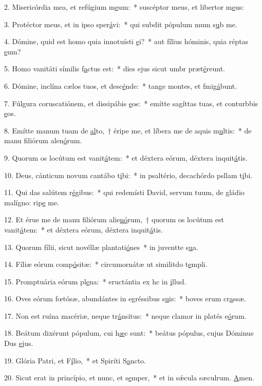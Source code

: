 2. Misericórdia mea, et refúgium m\uline{e}um:~* suscéptor meus, et libertor m\uline{e}us:\par 
3. Protéctor meus, et in ipso sper\uline{á}vi:~* qui subdit pópulum mum s\uline{u}b me.\par 
4. Dómine, quid est homo quia innotuísti \uline{e}i?~* aut fílius hóminis, quia réptas \uline{e}um?\par 
5. Homo vanitáti símilis f\uline{a}ctus est:~* dies ejus sicut umbr præt\uline{é}reunt.\par 
6. Dómine, inclína cælos tuos, et desc\uline{é}nde:~* tange montes, et fmig\uline{á}bunt.\par 
7. Fúlgura coruscatiónem, et dissipábis \uline{e}os:~* emítte sagíttas tuas, et conturbbis \uline{e}os.\par 
8. Emítte manum tuam de \uline{al}to,~† éripe me, et líbera me de aquis m\uline{u}ltis:~* de manu filiórum alen\uline{ó}rum.\par 
9. Quorum os locútum est vanit\uline{á}tem:~* et déxtera eórum, déxtera inquit\uline{á}tis.\par 
10. Deus, cánticum novum cantábo t\uline{i}bi:~* in psaltério, decachórdo psllam t\uline{i}bi.\par 
11. Qui das salútem r\uline{é}gibus:~* qui redemísti David, servum tuum, de gládio malígno: rip\uline{e} me.\par 
12. Et érue me de manu filiórum alie\uline{nó}rum,~† quorum os locútum est vanit\uline{á}tem:~* et déxtera eórum, déxtera inquit\uline{á}tis.\par 
13. Quorum fílii, sicut novéllæ plantati\uline{ó}nes~* in juventte s\uline{u}a.\par 
14. Fíliæ eórum comp\uline{ó}sitæ:~* circumornátæ ut similitdo t\uline{e}mpli.\par 
15. Promptuária eórum pl\uline{e}na:~* eructántia ex hc in \uline{i}llud.\par 
16. Oves eórum fœtósæ, abundántes in egréssibus s\uline{u}is:~* boves erum cr\uline{a}ssæ.\par 
17. Non est ruína macériæ, neque tr\uline{á}nsitus:~* neque clamor in platés e\uline{ó}rum.\par 
18. Beátum dixérunt pópulum, cui h\uline{æ}c sunt:~* beátus pópulus, cujus Dóminus Dus \uline{e}jus.\par 
19. Glória Patri, et F\uline{í}lio,~* et Spiríti S\uline{a}ncto.\par 
20. Sicut erat in princípio, et nunc, et s\uline{e}mper,~* et in sǽcula sæculrum. \uline{A}men.\par 
